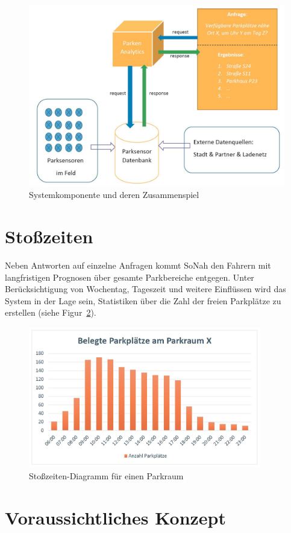 \documentclass{article}
\begin{document}
\vspace{4mm}
\begin{figure}[!ht]
    \centering
    \includegraphics[width=4.5in]{Architektur}
    \caption{Systemkomponente und deren Zusammenspiel}
    \label{fig:architektur}
\end{figure}

\section{Sto\ss{}zeiten}
Neben Antworten auf einzelne Anfragen kommt SoNah den Fahrern mit langfristigen Prognosen \"uber gesamte Parkbereiche entgegen. Unter Ber\"ucksichtigung von Wochentag, Tageszeit und weitere Einfl\"ussen wird das System in der Lage sein, Statistiken \"uber die Zahl der freien Parkpl\"atze zu erstellen (siehe Figur~\ref{stosszeiten}).

\begin{figure}[!ht]
    \centering
    \includegraphics[width=4.0in]{Stosszeiten}
    \caption{Sto\ss{}zeiten-Diagramm f\"ur einen Parkraum}
    \label{stosszeiten}
\end{figure}


\section{Voraussichtliches Konzept}
\end{document}
